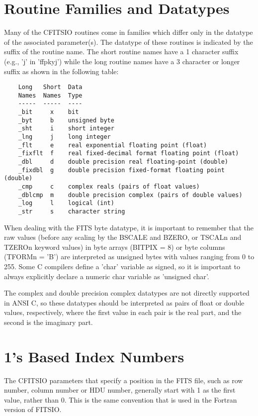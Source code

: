 \section{Routine Families and Datatypes}

Many of the CFITSIO routines come in families which differ only in the
datatype of the associated parameter(s).  The datatype of these
routines is indicated by the suffix of the routine name.  The short
routine names have a 1 character suffix (e.g., 'j' in 'ffpkyj')
while the long routine names have a 3 character or longer suffix
as shown in the following table:

\begin{verbatim}
    Long   Short  Data
    Names  Names  Type
    -----  -----  ----
    _bit     x    bit
    _byt     b    unsigned byte
    _sht     i    short integer
    _lng     j    long integer
    _flt     e    real exponential floating point (float)
    _fixflt  f    real fixed-decimal format floating point (float)
    _dbl     d    double precision real floating-point (double)
    _fixdbl  g    double precision fixed-format floating point (double)
    _cmp     c    complex reals (pairs of float values)
    _dblcmp  m    double precision complex (pairs of double values)
    _log     l    logical (int)
    _str     s    character string
\end{verbatim}
When dealing with the FITS byte datatype, it is important to remember that
the raw values (before any scaling by the BSCALE and BZERO, or TSCALn
and TZEROn keyword values) in byte arrays (BITPIX = 8) or byte columns
(TFORMn = 'B') are interpreted as unsigned bytes with values ranging
from 0 to 255.  Some C compilers define a 'char' variable as signed, so
it is important to always explicitly declare a numeric char variable as
'unsigned char'.

The complex and double precision complex datatypes are not directly
supported in ANSI C, so these datatypes should be interpreted as pairs
of float or double values, respectively, where the first  value in each
pair is the real part, and the second is the imaginary part.


\section{1's Based Index Numbers}

The CFITSIO parameters that specify a position in the FITS file, such as
row number, column number or HDU number, generally start with 1 as the
first value, rather than 0. This is the same convention that is used in
the Fortran version of FITSIO.


